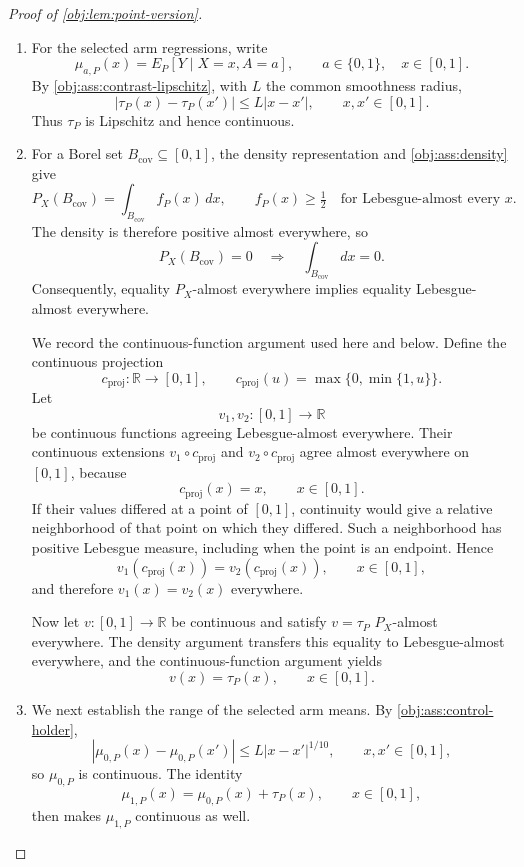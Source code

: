 \documentclass[11pt]{article}
\begin{document}
\begin{proof}[Proof of \cref{obj:lem:point-version}]
\begin{enumerate}
\item For the selected arm regressions, write
\[
\mu_{a,P}(x)=E_P[Y\mid X=x,A=a],
\qquad a\in\{0,1\},\quad x\in[0,1].
\]
By \cref{obj:ass:contrast-lipschitz}, with \(L\) the common smoothness radius,
\[
|\tau_P(x)-\tau_P(x')|\le L|x-x'|,
\qquad x,x'\in[0,1].
\]
Thus \(\tau_P\) is Lipschitz and hence continuous. %

\item For a Borel set \(B_{\mathrm{cov}}\subseteq[0,1]\), the density representation and \cref{obj:ass:density} give
\[
P_X(B_{\mathrm{cov}})
=\int_{B_{\mathrm{cov}}}f_P(x)\,dx,
\qquad
f_P(x)\ge\tfrac12
\quad\text{for Lebesgue-almost every }x.
\]
The density is therefore positive almost everywhere, so
\[
P_X(B_{\mathrm{cov}})=0
\quad\Longrightarrow\quad
\int_{B_{\mathrm{cov}}}dx=0.
\]
Consequently, equality \(P_X\)-almost everywhere implies equality Lebesgue-almost everywhere.

We record the continuous-function argument used here and below. Define the continuous projection
\[
c_{\mathrm{proj}}:\mathbb R\longrightarrow[0,1],
\qquad
c_{\mathrm{proj}}(u)=\max\{0,\min\{1,u\}\}.
\]
Let
\[
v_1,v_2:[0,1]\longrightarrow\mathbb R
\]
be continuous functions agreeing Lebesgue-almost everywhere. Their continuous extensions \(v_1\circ c_{\mathrm{proj}}\) and \(v_2\circ c_{\mathrm{proj}}\) agree almost everywhere on \([0,1]\), because
\[
c_{\mathrm{proj}}(x)=x,\qquad x\in[0,1].
\]
If their values differed at a point of \([0,1]\), continuity would give a relative neighborhood of that point on which they differed. Such a neighborhood has positive Lebesgue measure, including when the point is an endpoint. Hence
\[
v_1(c_{\mathrm{proj}}(x))
=v_2(c_{\mathrm{proj}}(x)),
\qquad x\in[0,1],
\]
and therefore \(v_1(x)=v_2(x)\) everywhere.

Now let \(v:[0,1]\to\mathbb R\) be continuous and satisfy \(v=\tau_P\) \(P_X\)-almost everywhere. The density argument transfers this equality to Lebesgue-almost everywhere, and the continuous-function argument yields
\[
v(x)=\tau_P(x),\qquad x\in[0,1].
\] %

\item We next establish the range of the selected arm means. By \cref{obj:ass:control-holder},
\[
|\mu_{0,P}(x)-\mu_{0,P}(x')|
\le L|x-x'|^{1/10},
\qquad x,x'\in[0,1],
\]
so \(\mu_{0,P}\) is continuous. The identity
\[
\mu_{1,P}(x)=\mu_{0,P}(x)+\tau_P(x),
\qquad x\in[0,1],
\]
then makes \(\mu_{1,P}\) continuous as well.


\end{enumerate}
\end{proof}
\end{document}
